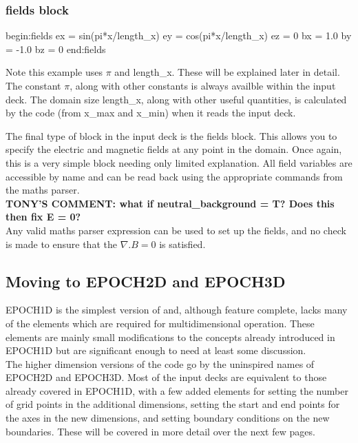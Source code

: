 \documentclass[12pt,a4paper]{article}
\newcommand{\inlineemph}[1]{{\color{warwicklight} \bf{#1}}}
\newcommand{\EPOCH}{{\color{warwickdark}\fontfamily{phv}\selectfont{EPOCH}}}
\newcommand{\tony}[1]{{\color{warwickred} \bf{TONY'S COMMENT:} \bf{#1}}\\}
\newenvironment{lboxverbatim}[1]{
\setlength{\FrameSep}{0pt}
\def\FrameCommand{\fboxsep=0pt \colorbox{shadecolor}}
\MakeFramed{\FrameRestore}
\vspace{-13.5pt}
\fvset{label=#1}
\boxverb
}{
\endboxverb
\vspace{-13.5pt}
\endMakeFramed
}
\begin{document}
\subsubsection{\inlineemph{fields} block}
\begin{lboxverbatim}{fields block}
begin:fields
   ex = sin(pi*x/length_x)
   ey = cos(pi*x/length_x)
   ez = 0
   bx = 1.0
   by = -1.0
   bz = 0
end:fields
\end{lboxverbatim}

Note this example uses $\pi$ and length\_x. These will be explained later in
detail. The constant $\pi$, along with other constants is always availble
within the input deck. The domain size length\_x, along with other useful
quantities, is calculated by the code (from x\_max and x\_min)
when it reads the input deck.

The final type of block in the {\EPOCH} input deck is the fields block. This
allows you to specify the electric and magnetic fields at any point in the
domain. Once again, this is a very simple block needing only limited
explanation. All field variables are accessible by name and can be read back
using the appropriate commands from the maths parser. \\
\tony{what if neutral\_background = T? Does this then fix E = 0?}

Any valid maths parser expression can be used to set up the fields, and no
check is made to ensure that the $\nabla.B = 0$ is satisfied. \\

\subsection{Moving to EPOCH2D and EPOCH3D}
EPOCH1D is the simplest version of {\EPOCH} and, although feature complete,
lacks many of the elements which are required for multidimensional operation.
These elements are mainly small modifications to the concepts already
introduced in EPOCH1D but are significant enough to need at least some
discussion.\\

The higher dimension versions of the code go by the uninspired names of EPOCH2D
and EPOCH3D. Most of the input decks are equivalent to those already covered in
EPOCH1D, with a few added elements for setting the number of grid points in the
additional dimensions, setting the start and end points for the axes in the new
dimensions, and setting boundary conditions on the new boundaries. These will
be covered in more detail over the next few pages.\\
\end{document}
